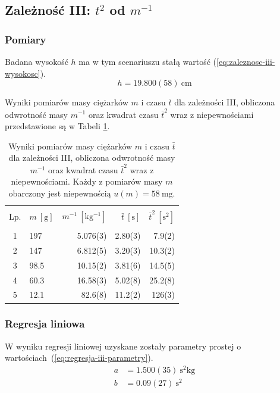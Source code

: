 \documentclass[twocolumn, a4paper, polish, 10pt]{article}
\begin{document}
\subsection{Zależność III: \texorpdfstring{$t^2$}{t²} od \texorpdfstring{$m^{-1}$}{1/m}}
\subsubsection{Pomiary}
Badana wysokość $h$ ma w tym scenariuszu stałą wartość (\ref{eq:zaleznosc-iii-wysokosc}).
\begin{equation}
    h = 19.800(58)~\mathrm{cm}
    \label{eq:zaleznosc-iii-wysokosc}
\end{equation}

Wyniki pomiarów masy ciężarków $m$ i czasu $\bar{t}$ dla zależności III, obliczona odwrotność masy $m^{-1}$ oraz kwadrat czasu $\bar{t}^2$ wraz z niepewnościami przedstawione są w Tabeli \ref{tab:zaleznosc-iii}.
\begin{table}[ht]
\begin{center}
\renewcommand*{\tablename}{Tabela}
\caption{\small Wyniki pomiarów masy ciężarków $m$ i czasu $\bar{t}$ dla zależności III, obliczona odwrotność masy $m^{-1}$ oraz kwadrat czasu $\bar{t}^2$ wraz z niepewnościami. Każdy z pomiarów masy $m$ obarczony jest niepewnością $u(m) = 58~\mathrm{mg}$.\vspace{0.15cm}
    \label{tab:zaleznosc-iii}}
    {\small
    \begin{tabular}{c l r r r}
    \hline \vspace{-0.35cm} \\
      Lp. & $m~[\mathrm{g}]$ & $m^{-1}~[\mathrm{kg^{-1}}]$
      & $\bar{t}~[\mathrm{s}]$ & $\bar{t}^2~[\mathrm{s^2}]$ \\
      \hline \vspace{-0.2cm} \\
      1 & 197 & 5.076(3) & 2.80(3) & 7.9(2) \\
      2 & 147 & 6.812(5) & 3.20(3) & 10.3(2) \\
      3 & 98.5 & 10.15(2) & 3.81(6) & 14.5(5) \\
      4 & 60.3 & 16.58(3) & 5.02(8) & 25.2(8) \\
      5 & 12.1 & 82.6(8) & 11.2(2) & 126(3) \\
    \hline
    \end{tabular}}
    \end{center}
\end{table}

\subsubsection{Regresja liniowa}
W wyniku regresji liniowej uzyskane zostały parametry prostej o wartościach~(\ref{eq:regresja-iii-parametry}).
\begin{equation}
\begin{split}
    a &= 1.500(35)~\mathrm{ s^2 kg } \\
    b &= 0.09(27)~\mathrm{s^2}
    \label{eq:regresja-iii-parametry}
\end{split}
\end{equation}
\end{document}
